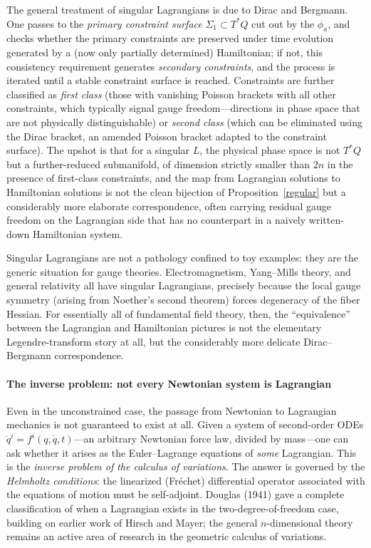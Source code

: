 The general treatment of singular Lagrangians is due to Dirac and Bergmann.
 One passes to the \emph{primary constraint surface}
$\Sigma_1 \subset T^*Q$ cut out by the $\phi_a$, and checks whether the primary
constraints are preserved under time evolution generated by a (now only
partially determined) Hamiltonian; if not, this consistency requirement
generates \emph{secondary constraints}, and the process is iterated until a
stable constraint surface is reached. Constraints are further classified as
\emph{first class} (those with vanishing Poisson brackets with all other
constraints, which typically signal gauge freedom---directions in phase space
that are not physically distinguishable) or \emph{second class} (which can be
eliminated using the Dirac bracket, an amended Poisson bracket adapted to the
constraint surface). The upshot is that for a
singular $L$, the physical phase space is not $T^*Q$ but a further-reduced
submanifold, of dimension strictly smaller than $2n$ in the presence of
first-class constraints, and the map from Lagrangian solutions to Hamiltonian
solutions is not the clean bijection of Proposition~\ref{regular} but a
considerably more elaborate correspondence, often carrying residual gauge
freedom on the Lagrangian side that has no counterpart in a naively
written-down Hamiltonian system.

Singular Lagrangians are not a pathology confined to toy examples: they are the
generic situation for gauge theories. Electromagnetism, Yang--Mills theory, and
general relativity all have singular Lagrangians, precisely because the local
gauge symmetry (arising from Noether's second theorem) forces degeneracy of the
fiber Hessian. For essentially all of fundamental field theory, then, the
``equivalence'' between the Lagrangian and Hamiltonian pictures is not the
elementary Legendre-transform story at all, but
the considerably more delicate Dirac--Bergmann correspondence.

\paragraph{The inverse problem: not every Newtonian system is Lagrangian}

Even in the unconstrained case, the passage from Newtonian to Lagrangian
mechanics is not guaranteed to exist at all. Given a system of second-order
ODEs $\ddot q^i = f^i(q,\dot q,t)$---an arbitrary Newtonian force law, divided
by mass---one can ask whether it arises as the Euler--Lagrange equations of
\emph{some} Lagrangian. This is the \emph{inverse problem of the calculus of
variations}. The answer is governed by the \emph{Helmholtz conditions}: the
linearized (Fr\'echet) differential operator associated with the equations of
motion must be self-adjoint. Douglas (1941) gave a complete classification
of when a Lagrangian exists in the two-degree-of-freedom case, building on
earlier work of Hirsch and Mayer; the general $n$-dimensional theory remains an
active area of research in the geometric calculus of variations.

